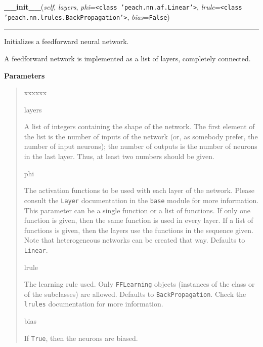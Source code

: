     \vspace{0.5ex}

    \begin{boxedminipage}{\textwidth}

    \raggedright \textbf{\_\_init\_\_}(\textit{self}, \textit{layers}, \textit{phi}=\texttt{{\textless}class 'peach.nn.af.Linear'{\textgreater}}, \textit{lrule}=\texttt{{\textless}class 'peach.nn.lrules.BackPropagation'{\textgreater}}, \textit{bias}=\texttt{False})

    \vspace{-1.5ex}

    \rule{\textwidth}{0.5\fboxrule}

Initializes a feedforward neural network.

A feedforward network is implemented as a list of layers, completely
connected.
    \vspace{1ex}

      \textbf{Parameters}
      \begin{quote}
        \begin{Ventry}{xxxxxx}

          \item[layers]


A list of integers containing the shape of the network. The first
element of the list is the number of inputs of the network (or, as
somebody prefer, the number of input neurons); the number of outputs
is the number of neurons in the last layer. Thus, at least two
numbers should be given.
          \item[phi]


The activation functions to be used with each layer of the network.
Please consult the \texttt{Layer} documentation in the \texttt{base} module
for more information. This parameter can be a single function or a
list of functions. If only one function is given, then the same
function is used in every layer. If a list of functions is given,
then the layers use the functions in the sequence given. Note that
heterogeneous networks can be created that way. Defaults to
\texttt{Linear}.
          \item[lrule]


The learning rule used. Only \texttt{FFLearning} objects (instances of
the class or of the subclasses) are allowed. Defaults to
\texttt{BackPropagation}. Check the \texttt{lrules} documentation for more
information.
          \item[bias]


If \texttt{True}, then the neurons are biased.
        \end{Ventry}


\end{quote}
\end{boxedminipage}
